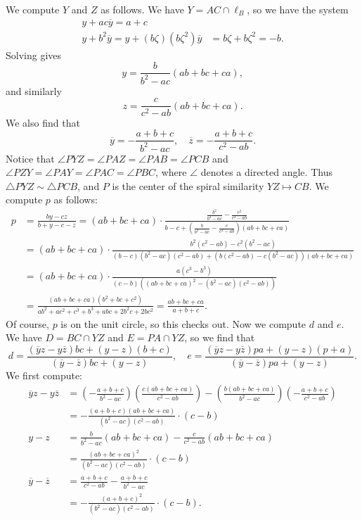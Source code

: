 \begin{enumerate}
 We compute $Y$ and $Z$ as follows. We have $Y=AC\cap \ell_B$, so we have the system \begin{align*}y + ac\overline y = a+c\\y+b^2\overline y = y + (b\zeta)(b\zeta^2)\overline y &= b\zeta + b\zeta^2 = -b.\end{align*}
Solving gives 
 \[y = \frac{b}{b^2-ac}(ab+bc+ca),\]and similarly
 \[z = \frac{c}{c^2-ab}(ab+bc+ca).\]We also find that 
 \[\overline y = -\frac{a+b+c}{b^2-ac},\quad \overline z = -\frac{a+b+c}{c^2-ab}.\]Notice that $\angle PYZ = \angle PAZ = \angle PAB = \angle PCB$ and $\angle PZY = \angle PAY = \angle PAC = \angle PBC$, where $\angle$ denotes a directed angle. Thus $\triangle PYZ\sim\triangle PCB$, and $P$ is the center of the spiral similarity $YZ\mapsto CB$. We compute $p$ as follows:\begin{align*}p &= \frac{by-cz}{b+y-c-z} = (ab+bc+ca)\cdot\frac{\frac{b^2}{b^2-ac}-\frac{c^2}{c^2-ab}}{b-c + (\frac{b}{b^2-ac}-\frac{c}{c^2-ab})(ab+bc+ca)}\\&= (ab+bc+ca)\cdot \frac{b^2(c^2-ab)-c^2(b^2-ac)}{(b-c)(b^2-ac)(c^2-ab)+(b(c^2-ab)-c(b^2-ac))(ab+bc+ca)}\\&= (ab+bc+ca)\cdot \frac{a(c^3-b^3)}{(c-b)((ab+bc+ca)^2 - (b^2-ac)(c^2-ab))}\\&= \frac{(ab+bc+ca)(b^2+bc+c^2)}{ab^2+ac^2+c^3+b^3+abc+2b^2c+2bc^2} =\frac{ab+bc+ca}{a+b+c}.\end{align*}
Of course, $p$ is on the unit circle, so this checks out. Now we compute $d$ and $e$. We have $D=BC\cap YZ$ and $E=PA\cap YZ$, so we find that
 \[d = \frac{(\overline yz-y\overline z)bc + (y-z)(b+c)}{(\overline y-\overline z)bc+(y-z)}, \quad e = \frac{(\overline yz-y\overline z)pa + (y-z)(p+a)}{(\overline y-\overline z)pa+(y-z)}.\]We first compute:\begin{align*}\overline yz-y\overline z &= \left(-\frac{a+b+c}{b^2-ac}\right)\left(\frac{c(ab+bc+ca)}{c^2-ab}\right) - \left(\frac{b(ab+bc+ca)}{b^2-ac}\right)\left(-\frac{a+b+c}{c^2-ab}\right)\\&= -\frac{(a+b+c)(ab+bc+ca)}{(b^2-ac)(c^2-ab)}\cdot (c-b)\\y-z &= \frac{b}{b^2-ac}(ab+bc+ca)-\frac{c}{c^2-ab}(ab+bc+ca)\\&= \frac{(ab+bc+ca)^2}{(b^2-ac)(c^2-ab)}\cdot (c-b)\\\overline y-\overline z &= \frac{a+b+c}{c^2-ab}-\frac{a+b+c}{b^2-ac}\\&= -\frac{(a+b+c)^2}{(b^2-ac)(c^2-ab)}\cdot (c-b).\end{align*}

\end{enumerate}
